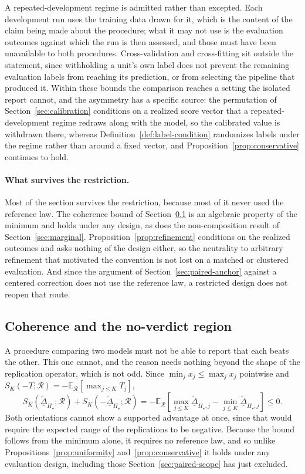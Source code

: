 \documentclass[11pt]{article}
\newcommand{\Regime}{\mathcal{R}}
\newcommand{\PSet}{\Pi_\star}
\newcommand{\E}{\mathbb{E}}
\newcommand{\RobDta}{\underline{\widetilde{\Delta}}_{\PSet}}
\theoremstyle{remark}
\begin{document}
A repeated-development regime is admitted rather than excepted. Each development run uses the training data drawn for it, which is the content of the claim being made about the procedure; what it may not use is the evaluation outcomes against which the run is then assessed, and those must have been unavailable to both procedures. Cross-validation and cross-fitting sit outside the statement, since withholding a unit's own label does not prevent the remaining evaluation labels from reaching its prediction, or from selecting the pipeline that produced it. Within these bounds the comparison reaches a setting the isolated report cannot, and the asymmetry has a specific source: the permutation of Section~\ref{sec:calibration} conditions on a realized score vector that a repeated-development regime redraws along with the model, so the calibrated value is withdrawn there, whereas Definition~\ref{def:label-condition} randomizes labels under the regime rather than around a fixed vector, and Proposition~\ref{prop:conservative} continues to hold.

\paragraph{What survives the restriction.}
Most of the section survives the restriction, because most of it never used the reference law. The coherence bound of Section~\ref{sec:orientation} is an algebraic property of the minimum and holds under any design, as does the non-composition result of Section~\ref{sec:marginal}. Proposition~\ref{prop:refinement} conditions on the realized outcomes and asks nothing of the design either, so the neutrality to arbitrary refinement that motivated the convention is not lost on a matched or clustered evaluation. And since the argument of Section~\ref{sec:paired-anchor} against a centered correction does not use the reference law, a restricted design does not reopen that route.

\subsection{Coherence and the no-verdict region}
\label{sec:orientation}

A procedure comparing two models must not be able to report that each beats the other. This one cannot, and the reason needs nothing beyond the shape of the replication operator, which is not odd. Since $\min_j x_j\leq\max_j x_j$ pointwise and $S_K(-T;\Regime)=-\E_{\Regime}[\max_{j\leq K}T_j]$,
\begin{equation}
S_K(\RobDta;\Regime)
+
S_K(-\RobDta;\Regime)
=
-\E_{\Regime}
\left[
\max_{j\leq K}\underline{\widetilde{\Delta}}_{\PSet,j}-\min_{j\leq K}\underline{\widetilde{\Delta}}_{\PSet,j}
\right]
\leq
0 .
\label{eq:orientation}
\end{equation}
Both orientations cannot show a supported advantage at once, since that would require the expected range of the replications to be negative. Because the bound follows from the minimum alone, it requires no reference law, and so unlike Propositions~\ref{prop:uniformity} and~\ref{prop:conservative} it holds under any evaluation design, including those Section~\ref{sec:paired-scope} has just excluded.
\end{document}
